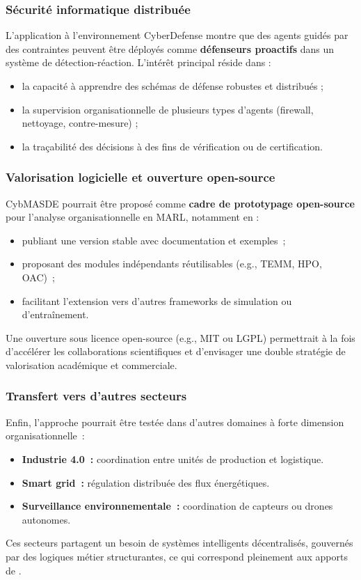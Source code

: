 \subsubsection*{Sécurité informatique distribuée}

L’application à l’environnement CyberDefense montre que des agents guidés par des contraintes peuvent être déployés comme \textbf{défenseurs proactifs} dans un système de détection-réaction. L’intérêt principal réside dans :
\begin{itemize}
    \item la capacité à apprendre des schémas de défense robustes et distribués ;
    \item la supervision organisationnelle de plusieurs types d’agents (firewall, nettoyage, contre-mesure) ;
    \item la traçabilité des décisions à des fins de vérification ou de certification.
\end{itemize}

\subsubsection*{Valorisation logicielle et ouverture open-source}

CybMASDE pourrait être proposé comme \textbf{cadre de prototypage open-source} pour l’analyse organisationnelle en MARL, notamment en :
\begin{itemize}
    \item publiant une version stable avec documentation et exemples~;
    \item proposant des modules indépendants réutilisables (e.g., TEMM, HPO, OAC)~;
    \item facilitant l’extension vers d’autres frameworks de simulation ou d’entraînement.
\end{itemize}

Une ouverture sous licence open-source (e.g., MIT ou LGPL) permettrait à la fois d’accélérer les collaborations scientifiques et d’envisager une double stratégie de valorisation académique et commerciale.

\subsubsection*{Transfert vers d'autres secteurs}

Enfin, l’approche pourrait être testée dans d'autres domaines à forte dimension organisationnelle~:
\begin{itemize}
    \item \textbf{Industrie 4.0~:} coordination entre unités de production et logistique.
    \item \textbf{Smart grid~:} régulation distribuée des flux énergétiques.
    \item \textbf{Surveillance environnementale~:} coordination de capteurs ou drones autonomes.
\end{itemize}

Ces secteurs partagent un besoin de systèmes intelligents décentralisés, gouvernés par des logiques métier structurantes, ce qui correspond pleinement aux apports de .


\clearpage
\thispagestyle{empty}
\null
\newpage
